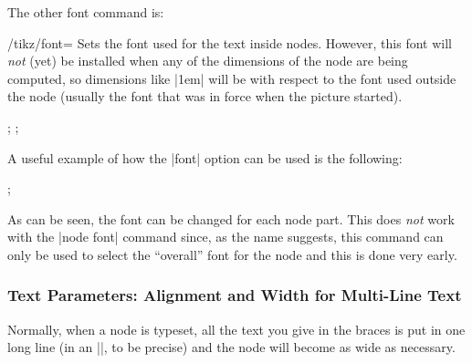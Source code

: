 The other font command is:
%
\begin{key}{/tikz/font=}
    Sets the font used for the text inside nodes. However, this font will
    \emph{not} (yet) be installed when any of the dimensions of the node are
    being computed, so dimensions like |1em| will be with respect to the font
    used outside the node (usually the font that was in force when the picture
    started).
\begin{codeexample}[]
\end{codeexample}

\begin{codeexample}[]
\tikz {};
\tikz {};
\end{codeexample}

    A useful example of how the |font| option can be used is the following:
\begin{codeexample}[preamble={\usetikzlibrary{shapes.multipart}}]
\tikz [every text node part/.style={font=\itshape},
       every lower node part/.style={font=\footnotesize}]
  ;
\end{codeexample}

    As can be seen, the font can be changed for each node part. This does
    \emph{not} work with the |node font| command since, as the name suggests,
    this command can only be used to select the ``overall'' font for the node
    and this is done very early.
\end{key}


\subsubsection{Text Parameters: Alignment and Width for Multi-Line Text}

Normally, when a node is typeset, all the text you give in the braces is put in
one long line (in an |\hbox|, to be precise) and the node will become as wide
as necessary.

